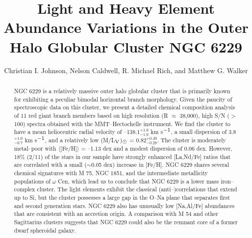 \documentclass[12pt,preprint]{emulateapj}
\begin{document}
\title{Light and Heavy Element Abundance Variations in the Outer Halo Globular 
Cluster NGC 6229}

\author{
Christian I. Johnson,
Nelson Caldwell, 
R. Michael Rich, and
Matthew G. Walker
}





\begin{abstract}

NGC 6229 is a relatively massive outer halo globular cluster that is primarily
known for exhibiting a peculiar bimodal horizontal branch morphology.  Given
the paucity of spectroscopic data on this cluster, we present a detailed
chemical composition analysis of 11 red giant branch members based on
high resolution (R $\approx$ 38,000), high S/N ($>$ 100) spectra obtained with
the MMT--Hectochelle instrument.  We find the cluster to have a mean 
heliocentric radial velocity of --138.1$_{-1.0}^{+1.0}$ km s$^{\rm -1}$, a 
small dispersion of 3.8$_{-0.7}^{+1.0}$ km s$^{\rm -1}$, and a relatively low
(M/L$_{\rm V}$)$_{\rm \odot}$ = 0.82$_{-0.28}^{+0.49}$.  The cluster is 
moderately metal--poor with $\langle$[Fe/H]$\rangle$ = --1.13 dex and a 
modest dispersion of 0.06 dex.  However, 18$\%$ (2/11) of the stars in our 
sample have strongly enhanced [La,Nd/Fe] ratios that are correlated with 
a small ($\sim$0.05 dex) increase in [Fe/H].  NGC 6229 shares several 
chemical signatures with M 75, NGC 1851, and the intermediate metallicity
populations of $\omega$ Cen, which lead us to conclude that NGC 6229 is a
lower mass iron--complex cluster.  The light elements exhibit the classical
(anti--)correlations that extend up to Si, but the cluster possesses a
large gap in the O--Na plane that separates first and second generation stars.
NGC 6229 also has unusually low [Na,Al/Fe] abundances that are consistent with
an accretion origin.  A comparison with M 54 and other Sagittarius clusters 
suggests that NGC 6229 could also be the remnant core of a former dwarf 
spheroidal galaxy.

\end{abstract}
\end{document}
